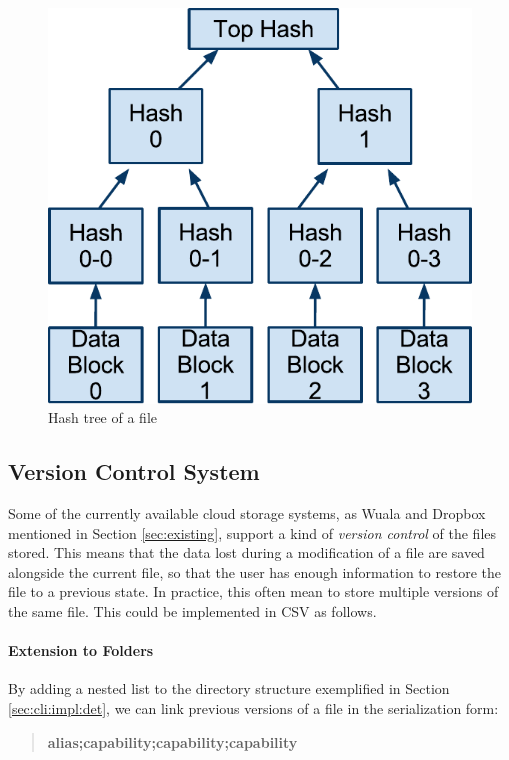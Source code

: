 \documentclass[pdftex,english,10pt,b5paper,twoside]{book}
\begin{document}
\begin{figure}[!h]
\centering
\includegraphics[scale=0.55]{hash-tree.pdf}
\caption{Hash tree of a file}
\label{fig:hashtree}
\end{figure}

\subsection{Version Control System}

Some of the currently available cloud storage systems, as Wuala and Dropbox
mentioned in Section \ref{sec:existing}, support a kind of \emph{version
control} of the files stored. This means that the data lost during a
modification of a file are saved alongside the current file, so that the user
has enough information to restore the file to a previous state.  In practice,
this often mean to store multiple versions of the same file.  This could be
implemented in \ac{CSV} as follows.

\paragraph{Extension to Folders} By adding a nested list to the directory
structure exemplified in Section \ref{sec:cli:impl:det}, we can link previous
versions of a file in the serialization form:

\begin{quote}
    \centering
    \textbf{alias;capability;capability;capability}
\end{quote}
\end{document}
